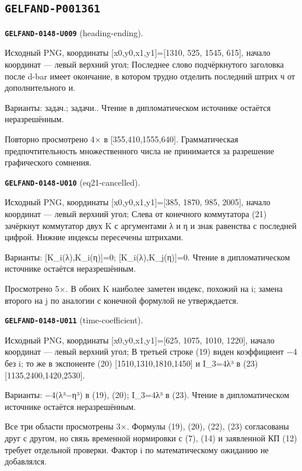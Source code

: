 \documentclass[11pt]{article}
\theoremstyle{definition}
\theoremstyle{remark}
\begin{document}
\subsection*{\texttt{GELFAND-P001361}}
\noindent\leavevmode{}\label{GELFAND-P001361:heading-ending:note}\textbf{\texttt{GELFAND-0148-U009}} (heading-ending).\par\nopagebreak[4]
Исходный PNG, координаты [x0,y0,x1,y1]=[1310, 525, 1545, 615], начало координат — левый верхний угол; Последнее слово подчёркнутого заголовка после d-bar имеет окончание, в котором трудно отделить последний штрих ч от дополнительного и.\par
Варианты: задач.; задачи.. Чтение в дипломатическом источнике остаётся неразрешённым.\par
Повторно просмотрено 4× в [355,410,1555,640]. Грамматическая предпочтительность множественного числа не принимается за разрешение графического сомнения.\par\medskip
\noindent\leavevmode{}\label{GELFAND-P001361:eq21-cancelled:note}\textbf{\texttt{GELFAND-0148-U010}} (eq21-cancelled).\par\nopagebreak[4]
Исходный PNG, координаты [x0,y0,x1,y1]=[385, 1870, 985, 2005], начало координат — левый верхний угол; Слева от конечного коммутатора (21) зачёркнут коммутатор двух K с аргументами λ и η и знак равенства с последней цифрой. Нижние индексы пересечены штрихами.\par
Варианты: [K\_i(λ),K\_i(η)]=0; [K\_i(λ),K\_j(η)]=0. Чтение в дипломатическом источнике остаётся неразрешённым.\par
Просмотрено 5×. В обоих K наиболее заметен индекс, похожий на i; замена второго на j по аналогии с конечной формулой не утверждается.\par\medskip
\noindent\leavevmode{}\label{GELFAND-P001361:time-coefficient:note}\textbf{\texttt{GELFAND-0148-U011}} (time-coefficient).\par\nopagebreak[4]
Исходный PNG, координаты [x0,y0,x1,y1]=[625, 1075, 1010, 1220], начало координат — левый верхний угол; В третьей строке (19) виден коэффициент −4 без i; то же в экспоненте (20) [1510,1310,1810,1450] и I\_3=4λ³ в (23) [1135,2400,1420,2530].\par
Варианты: −4(λ³−η³) в (19), (20); I\_3=4λ³ в (23). Чтение в дипломатическом источнике остаётся неразрешённым.\par
Все три области просмотрены 3×. Формулы (19), (20), (22), (23) согласованы друг с другом, но связь временной нормировки с (7), (14) и заявленной КП (12) требует отдельной проверки. Фактор i по математическому ожиданию не добавлялся.\par\medskip
\end{document}
